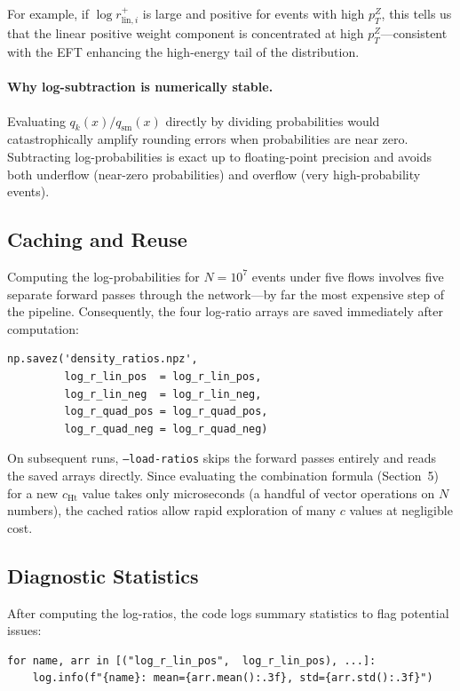 \documentclass[11pt,a4paper]{article}
\begin{document}
For example, if $\log r_{\text{lin},i}^{+}$ is large and positive for events with high $p_T^Z$,
this tells us that the linear positive weight component is concentrated at high $p_T^Z$---consistent
with the EFT enhancing the high-energy tail of the distribution.

\paragraph{Why log-subtraction is numerically stable.}
Evaluating $q_k(x)/q_{\text{sm}}(x)$ directly by dividing probabilities would catastrophically
amplify rounding errors when probabilities are near zero.  Subtracting log-probabilities is exact up
to floating-point precision and avoids both underflow (near-zero probabilities) and overflow
(very high-probability events).

\subsection{Caching and Reuse}

Computing the log-probabilities for $N = 10^7$ events under five flows involves five separate
forward passes through the network---by far the most expensive step of the pipeline.  Consequently,
the four log-ratio arrays are saved immediately after computation:

\begin{lstlisting}
np.savez('density_ratios.npz',
         log_r_lin_pos  = log_r_lin_pos,
         log_r_lin_neg  = log_r_lin_neg,
         log_r_quad_pos = log_r_quad_pos,
         log_r_quad_neg = log_r_quad_neg)
\end{lstlisting}

On subsequent runs, \texttt{--load-ratios} skips the forward passes entirely and reads the saved
arrays directly.  Since evaluating the combination formula (Section~5) for a new $c_{\text{Ht}}$
value takes only microseconds (a handful of vector operations on $N$ numbers), the cached ratios
allow rapid exploration of many $c$ values at negligible cost.

\subsection{Diagnostic Statistics}

After computing the log-ratios, the code logs summary statistics to flag potential issues:

\begin{lstlisting}
for name, arr in [("log_r_lin_pos",  log_r_lin_pos), ...]:
    log.info(f"{name}: mean={arr.mean():.3f}, std={arr.std():.3f}")
\end{lstlisting}
\end{document}
